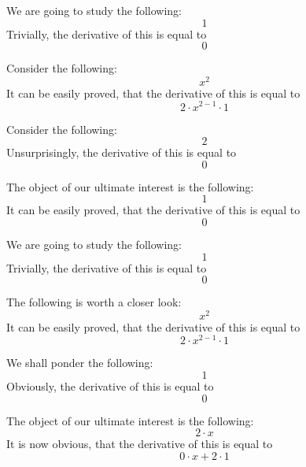 \documentclass{article}
\begin{document}
We are going to study the following:
\begin{equation}
1 
\end{equation}
Trivially, the derivative of this is equal to
\begin{equation}
0 
\end{equation}

Consider the following:
\begin{equation}
x ^{2 } 
\end{equation}
It can be easily proved, that the derivative of this is equal to
\begin{equation}
2 \cdot x ^{2 - 1 } \cdot 1 
\end{equation}

Consider the following:
\begin{equation}
2 
\end{equation}
Unsurprisingly, the derivative of this is equal to
\begin{equation}
0 
\end{equation}

The object of our ultimate interest is the following:
\begin{equation}
1 
\end{equation}
It can be easily proved, that the derivative of this is equal to
\begin{equation}
0 
\end{equation}

We are going to study the following:
\begin{equation}
1 
\end{equation}
Trivially, the derivative of this is equal to
\begin{equation}
0 
\end{equation}

The following is worth a closer look:
\begin{equation}
x ^{2 } 
\end{equation}
It can be easily proved, that the derivative of this is equal to
\begin{equation}
2 \cdot x ^{2 - 1 } \cdot 1 
\end{equation}

We shall ponder the following:
\begin{equation}
1 
\end{equation}
Obviously, the derivative of this is equal to
\begin{equation}
0 
\end{equation}

The object of our ultimate interest is the following:
\begin{equation}
2 \cdot x 
\end{equation}
It is now obvious, that the derivative of this is equal to
\begin{equation}
0 \cdot x + 2 \cdot 1 
\end{equation}
\end{document}
